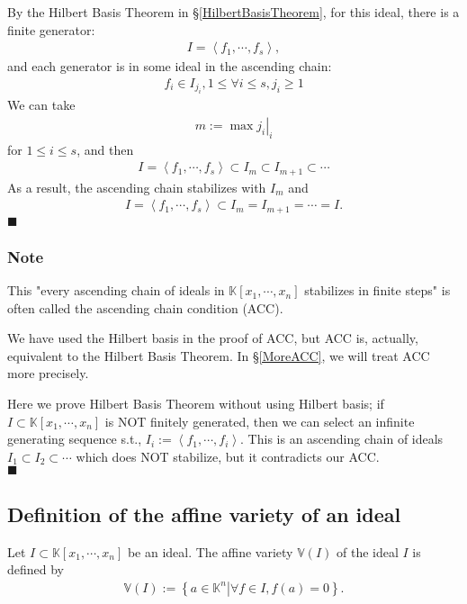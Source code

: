 \documentclass[11pt]{book}
\begin{document}
By the Hilbert Basis Theorem in \S\ref{HilbertBasisTheorem}, for this ideal, there is a finite generator:
\begin{eqnarray}
I = \left<f_1, \cdots, f_s \right>,
\end{eqnarray}
and each generator is in some ideal in the ascending chain:
\begin{eqnarray}
f_i \in I_{j_i}, 1 \leq \forall i \leq s, j_i \geq 1
\end{eqnarray}
We can take 
\begin{eqnarray}
m := \left. \max j_i \right|_i
\end{eqnarray}
for $1 \leq i \leq s$, and then
\begin{eqnarray}
I = \left<f_1, \cdots, f_s \right> \subset I_m \subset I_{m+1} \subset \cdots 
\end{eqnarray}
As a result, the ascending chain stabilizes with $I_m$ and 
\begin{eqnarray}
I = \left<f_1, \cdots, f_s \right> \subset I_m = I_{m+1} = \cdots = I.
\end{eqnarray}
$\blacksquare$

\subsubsection{Note}
This "every ascending chain of ideals in $\mathbb{K}[x_1, \cdots, x_{n}]$ stabilizes in finite steps" is often called the ascending chain condition (ACC).

We have used the Hilbert basis in the proof of ACC, but ACC is, actually, equivalent to the Hilbert Basis Theorem.
In \S\ref{MoreACC}, we will treat ACC more precisely.

Here we prove Hilbert Basis Theorem without using Hilbert basis; if $I \subset \mathbb{K}[x_1, \cdots, x_{n}]$ is NOT finitely generated, then we can select an infinite generating sequence s.t., $I_i := \left<f_1, \cdots, f_i \right>$.
This is an ascending chain of ideals $I_1 \subset I_2 \subset \cdots$ which does NOT stabilize, but it contradicts our ACC.\\
$\blacksquare$


\subsection{Definition of the affine variety of an ideal}
Let $I \subset \mathbb{K}[x_1, \cdots, x_n]$ be an ideal.
The affine variety $\mathbb{V}(I)$ of the ideal $I$ is defined by
\begin{eqnarray}
\mathbb{V}(I) := \left\{ \left. a \in \mathbb{K}^n \right| \forall f \in I, f(a) = 0\right\}.
\end{eqnarray}
\end{document}
